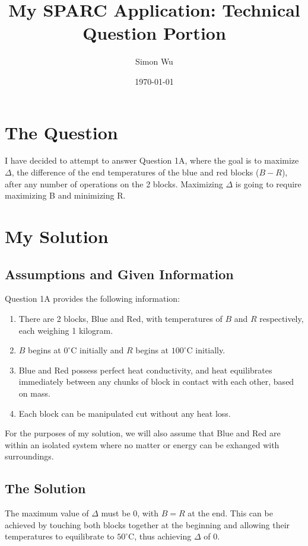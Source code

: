 \documentclass[12pt,letter]{article}
\title{My SPARC Application: Technical Question Portion}
\author{Simon Wu}
\date{\today}
\begin{document}
\maketitle

\section{The Question}

I have decided to attempt to answer Question 1A, where the goal is to maximize $\Delta$,
the difference of the end temperatures of the blue and red blocks ($B - R$), after
any number of operations on the 2 blocks. 
Maximizing $\Delta$ is going to require maximizing B and minimizing R.


\section{My Solution}

\subsection{Assumptions and Given Information}

Question 1A provides the following information:
\begin{enumerate}
    \item There are 2 blocks, Blue and Red, with temperatures of $B$ and $R$ 
    respectively, each weighing 1 kilogram.
    \item $B$ begins at $0^{\circ}$C initially and $R$ begins at $100^{\circ}$C
    initially.
    \item Blue and Red possess perfect heat conductivity, and heat equilibrates
    immediately between any chunks of block in contact with each other, based
    on mass.
    \item Each block can be manipulated cut without any heat loss.
\end{enumerate}

For the purposes of my solution, we will also assume that Blue and Red are within
an isolated system where no matter or energy can be exhanged with surroundings.

\subsection{The Solution}

The maximum value of $\Delta$ must be 0, with $B = R$ at the end. This can be 
achieved by touching both blocks together at the beginning and allowing their 
temperatures to equilibrate to $50^{\circ}$C, thus achieving $\Delta$ of 0.
\end{document}

